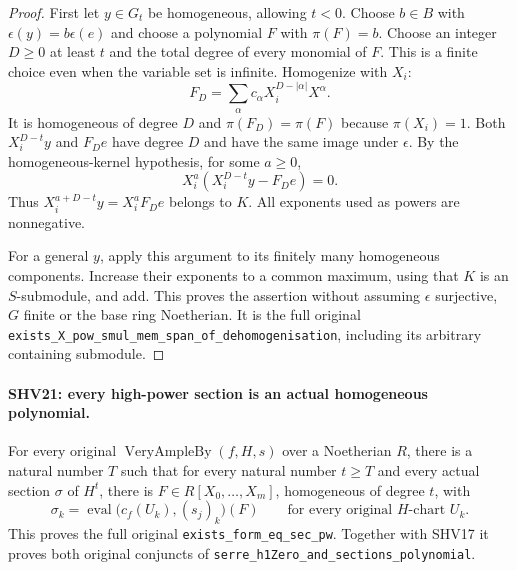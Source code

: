 \begin{proof}
First let $y\in G_t$ be homogeneous, allowing $t<0$.
Choose $b\in B$ with $\epsilon(y)=b\epsilon(e)$ and choose
a polynomial $F$ with $\pi(F)=b$.
Choose an integer $D\ge0$ at least $t$ and the total degree
of every monomial of $F$.  This is a finite choice even
when the variable set is infinite.  Homogenize with $X_i$:
\[
 F_D=\sum_\alpha c_\alpha X_i^{D-|\alpha|}X^\alpha .
                                                        \tag{SHV.30}
\]
It is homogeneous of degree $D$ and $\pi(F_D)=\pi(F)$
because $\pi(X_i)=1$.
Both $X_i^{D-t}y$ and $F_D e$ have degree $D$ and have
the same image under $\epsilon$.
By the homogeneous-kernel hypothesis, for some $a\ge0$,
\[
 X_i^a(X_i^{D-t}y-F_D e)=0.
\]
Thus $X_i^{a+D-t}y=X_i^aF_D e$ belongs to $K$.
All exponents used as powers are nonnegative.

For a general $y$, apply this argument to its finitely many
homogeneous components.  Increase their exponents to a common
maximum, using that $K$ is an $S$-submodule, and add.
This proves the assertion without assuming $\epsilon$
surjective, $G$ finite or the base ring Noetherian.
It is the full original
\texttt{exists\_\allowbreak X\_\allowbreak pow\_\allowbreak smul\_\allowbreak mem\_\allowbreak span\_\allowbreak of\_\allowbreak dehomogenisation},
including its arbitrary containing submodule.
\end{proof}

\paragraph{SHV21: every high-power section is an actual homogeneous polynomial.}
\label{claim:SHV21}
For every original $\operatorname{VeryAmpleBy}(f,H,s)$ over
a Noetherian $R$, there is a natural number $T$ such that
for every natural number $t\ge T$ and every actual section
$\sigma$ of $H^t$, there is $F\in R[X_0,\ldots,X_m]$,
homogeneous of degree $t$, with
\[
 \sigma_k=
  \operatorname{eval}\bigl(c_f(U_k),(s_j)_k\bigr)(F)
                 \qquad\text{for every original }H\text{-chart }U_k.
                                                        \tag{SHV.31}
\]
This proves the full original \texttt{exists\_\allowbreak form\_\allowbreak eq\_\allowbreak sec\_\allowbreak pw}.
Together with SHV17 it proves both original conjuncts of
\texttt{serre\_\allowbreak h1Zero\_\allowbreak and\_\allowbreak sections\_\allowbreak polynomial}.

